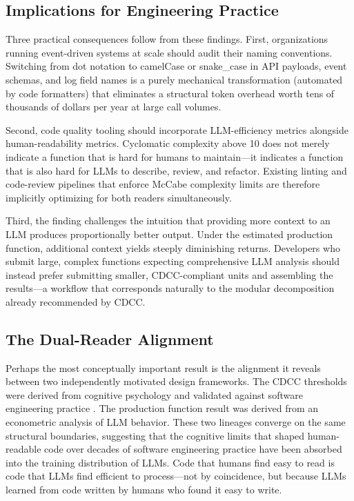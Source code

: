 \documentclass[11pt,a4paper]{article}
\begin{document}
\subsection{Implications for Engineering Practice}

Three practical consequences follow from these findings. First, organizations
running event-driven systems at scale should audit their naming conventions.
Switching from dot notation to camelCase or snake\_case in API payloads,
event schemas, and log field names is a purely mechanical transformation
(automated by code formatters) that eliminates a structural token overhead
worth tens of thousands of dollars per year at large call volumes.

Second, code quality tooling should incorporate LLM-efficiency metrics
alongside human-readability metrics. Cyclomatic complexity above 10 does not
merely indicate a function that is hard for humans to maintain---it indicates
a function that is also hard for LLMs to describe, review, and refactor.
Existing linting and code-review pipelines that enforce McCabe complexity
limits are therefore implicitly optimizing for both readers simultaneously.

Third, the finding challenges the intuition that providing more context to
an LLM produces proportionally better output. Under the estimated production
function, additional context yields steeply diminishing returns.
Developers who submit large, complex functions expecting comprehensive LLM
analysis should instead prefer submitting smaller, CDCC-compliant units
and assembling the results---a workflow that corresponds naturally to
the modular decomposition already recommended by CDCC.

\subsection{The Dual-Reader Alignment}

Perhaps the most conceptually important result is the alignment it reveals
between two independently motivated design frameworks. The CDCC thresholds
were derived from cognitive psychology \citep{miller1956,cowan2001,sweller1988}
and validated against software engineering practice \citep{watson1996}.
The production function result was derived from an econometric analysis of
LLM behavior. These two lineages converge on the same structural boundaries,
suggesting that the cognitive limits that shaped human-readable code over
decades of software engineering practice have been absorbed into the training
distribution of LLMs. Code that humans find easy to read is code that
LLMs find efficient to process---not by coincidence, but because LLMs
learned from code written by humans who found it easy to write.
\end{document}
